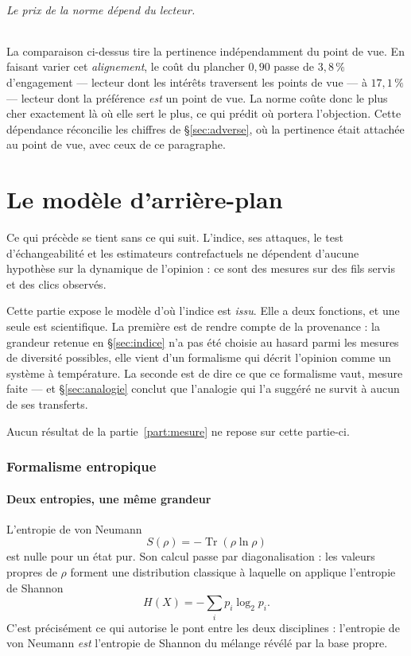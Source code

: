 \documentclass[11pt,a4paper]{article}
\begin{document}
\paragraph{Le prix de la norme dépend du lecteur.} La comparaison ci-dessus tire la pertinence
indépendamment du point de vue. En faisant varier cet \emph{alignement}, le coût du plancher
$0{,}90$ passe de $3{,}8\,\%$ d'engagement --- lecteur dont les intérêts traversent les points de
vue --- à $17{,}1\,\%$ --- lecteur dont la préférence \emph{est} un point de vue. La norme coûte
donc le plus cher exactement là où elle sert le plus, ce qui prédit où portera l'objection. Cette
dépendance réconcilie les chiffres de \S\ref{sec:adverse}, où la pertinence était attachée au
point de vue, avec ceux de ce paragraphe.


\part{Le modèle d'arrière-plan}
\label{part:modele}

Ce qui précède se tient sans ce qui suit. L'indice, ses attaques, le test d'échangeabilité et
les estimateurs contrefactuels ne dépendent d'aucune hypothèse sur la dynamique de l'opinion :
ce sont des mesures sur des fils servis et des clics observés.

Cette partie expose le modèle d'où l'indice est \emph{issu}. Elle a deux fonctions, et une
seule est scientifique. La première est de rendre compte de la provenance : la grandeur
retenue en \S\ref{sec:indice} n'a pas été choisie au hasard parmi les mesures de diversité
possibles, elle vient d'un formalisme qui décrit l'opinion comme un système à température.
La seconde est de dire ce que ce formalisme vaut, mesure faite --- et
\S\ref{sec:analogie} conclut que l'analogie qui l'a suggéré ne survit à aucun de ses
transferts.

Aucun résultat de la partie~\ref{part:mesure} ne repose sur cette partie-ci.

\section{Formalisme entropique}

\subsection{Deux entropies, une même grandeur}

L'entropie de von Neumann \citep{vonneumann1932}
\begin{equation}
S(\rho) = -\operatorname{Tr}(\rho \ln \rho)
\end{equation}
est nulle pour un état pur. Son calcul passe par diagonalisation : les valeurs propres de
$\rho$ forment une distribution classique à laquelle on applique l'entropie de Shannon
\citep{shannon1948}
\begin{equation}
H(X) = -\sum_i p_i \log_2 p_i .
\end{equation}
C'est précisément ce qui autorise le pont entre les deux disciplines : l'entropie de von
Neumann \emph{est} l'entropie de Shannon du mélange révélé par la base propre.
\end{document}
